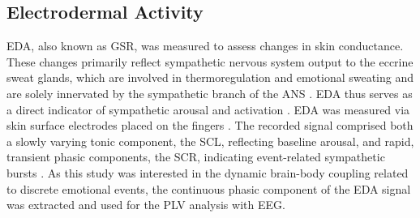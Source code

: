 \subsection{Electrodermal Activity}
\gls{EDA}, also known as \gls{GSR}, was measured to assess changes in skin conductance. These changes primarily reflect sympathetic nervous system output to the eccrine sweat glands, which are involved in thermoregulation and emotional sweating and are solely innervated by the sympathetic branch of the \gls{ANS} \parencite{dawsonElectrodermalSystem2007, boucseinElectrodermalActivity2012}. \gls{EDA} thus serves as a direct indicator of sympathetic arousal and activation \parencite{kreibigAutonomicNervousSystem2010}. \gls{EDA} was measured via skin surface electrodes placed on the fingers \parencite{boucseinElectrodermalActivity2012}. The recorded signal comprised both a slowly varying tonic component, the \gls{SCL}, reflecting baseline arousal, and rapid, transient phasic components, the \gls{SCR}, indicating event-related sympathetic bursts \parencite{dawsonElectrodermalSystem2007}. As this study was interested in the dynamic brain-body coupling related to discrete emotional events, the continuous phasic component of the \gls{EDA} signal was extracted and used for the \gls{PLV} analysis with \gls{EEG}.

